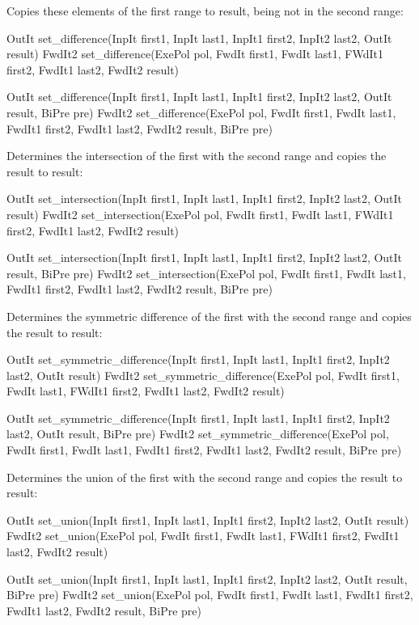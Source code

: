 Copies these elements of the first range to result, being not in the second range:

\begin{cpp}
OutIt set_difference(InpIt first1, InpIt last1, InpIt1 first2, InpIt2 last2,
					 OutIt result)
FwdIt2 set_difference(ExePol pol, FwdIt first1, FwdIt last1,
					  FWdIt1 first2, FwdIt1 last2, FwdIt2 result)
					  
OutIt set_difference(InpIt first1, InpIt last1, InpIt1 first2, InpIt2 last2,
					 OutIt result, BiPre pre)
FwdIt2 set_difference(ExePol pol, FwdIt first1, FwdIt last1,
					  FwdIt1 first2, FwdIt1 last2, FwdIt2 result, BiPre pre)
\end{cpp}

Determines the intersection of the first with the second range and copies the result to result:

\begin{cpp}
OutIt set_intersection(InpIt first1, InpIt last1, InpIt1 first2, InpIt2 last2,
					   OutIt result)
FwdIt2 set_intersection(ExePol pol, FwdIt first1, FwdIt last1,
						FWdIt1 first2, FwdIt1 last2, FwdIt2 result)
						
OutIt set_intersection(InpIt first1, InpIt last1, InpIt1 first2, InpIt2 last2,
					   OutIt result, BiPre pre)
FwdIt2 set_intersection(ExePol pol, FwdIt first1, FwdIt last1,
						FwdIt1 first2, FwdIt1 last2, FwdIt2 result, BiPre pre)
\end{cpp}

Determines the symmetric difference of the first with the second range and copies the result to result:

\begin{cpp}
OutIt set_symmetric_difference(InpIt first1, InpIt last1,
								InpIt1 first2, InpIt2 last2, OutIt result)
FwdIt2 set_symmetric_difference(ExePol pol, FwdIt first1, FwdIt last1,
								FWdIt1 first2, FwdIt1 last2, FwdIt2 result)

OutIt set_symmetric_difference(InpIt first1, InpIt last1,
							   InpIt1 first2, InpIt2 last2, OutIt result,
							   BiPre pre)
FwdIt2 set_symmetric_difference(ExePol pol, FwdIt first1, FwdIt last1,
								FwdIt1 first2, FwdIt1 last2, FwdIt2 result,
								BiPre pre)
\end{cpp}

Determines the union of the first with the second range and copies the result to result:

\begin{cpp}
OutIt set_union(InpIt first1, InpIt last1,
				InpIt1 first2, InpIt2 last2, OutIt result)
FwdIt2 set_union(ExePol pol, FwdIt first1, FwdIt last1,
				 FWdIt1 first2, FwdIt1 last2, FwdIt2 result)

OutIt set_union(InpIt first1, InpIt last1,
				InpIt1 first2, InpIt2 last2, OutIt result, BiPre pre)
FwdIt2 set_union(ExePol pol, FwdIt first1, FwdIt last1,
				 FwdIt1 first2, FwdIt1 last2, FwdIt2 result, BiPre pre)
\end{cpp}

